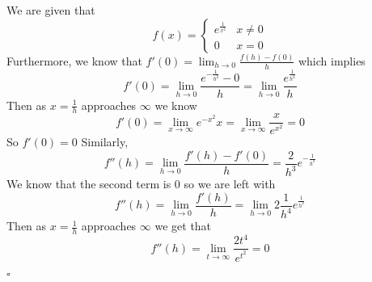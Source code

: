 \documentclass[12pt]{article}
\newenvironment{proof}{\noindent{\bf Proof.}}{\hfill $\square$\medskip}
\begin{document}
\begin{proof}
    We are given that
    $$
        f(x)=
        \begin{cases}
            e^{\frac{1}{x^{2}}} & x\neq0 \\
            0                   & x=0
        \end{cases}
    $$
    Furthermore, we know that $f'(0)=\lim_{h\to0}\frac{f(h)-f(0)}{h}$ which implies
    $$f'(0)=\lim_{h\to0}\frac{e^{-\frac{1}{h^{2}}}-0}{h}=\lim_{h\to0}\frac{e^{\frac{1}{h^{2}}}}{h}$$
    Then as $x=\frac{1}{h}$ approaches $\infty$ we know
    $$f'(0)=\lim_{x\to\infty}e^{-x^{2}}x=\lim_{x\to\infty}\frac{x}{e^{x^{2}}}=0$$
    So $f'(0)=0$
    Similarly,
    $$f''(h)=\lim_{h\to0}\frac{f'(h)-f'(0)}{h}=\frac{2}{h^{3}}e^{-\frac{1}{h^{2}}}$$
    We know that the second term is $0$ so we are left with
    $$f''(h)=\lim_{h\to0}\frac{f'(h)}{h}=\lim_{h\to0}2\frac{1}{h^{4}}{e^{\frac{1}{h^{2}}}}$$
    Then as $x=\frac{1}{h}$ approaches $\infty$ we get that
    $$f''(h)=\lim_{t\to\infty}\frac{2t^{4}}{e^{t^{2}}}=0$$

\end{proof}
\end{document}

